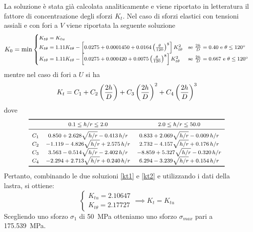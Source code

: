 La soluzione è stata già calcolata analiticamente e viene riportato in letteratura il fattore di concentrazione degli sforzi $K_t$.
Nel caso di sforzi elastici con tensioni assiali e con fori a $V$ viene riportata la seguente soluzione
\begin{equation}\footnotesize\label{kt1}
K_0=\min
\begin{cases}
K_{t\theta}=K_{tu} & \\
K_{t\theta} = 1.11 K_{t\theta} - \left[0.0275 + 0.0001450 + 0.0164\left(\frac{\theta}{120}\right)^8\right]K_{t\theta}^2 & \text{se $\frac{2h}{D} = 0.40$ e $\theta\le \ang{120}$}\\
K_{t\theta} = 1.11 K_{t\theta} - \left[0.0275 + 0.000420 + 0.0075\left(\frac{\theta}{120}\right)^8\right]K_{t\theta}^2 & \text{se $\frac{2h}{D} = 0.667$ e $\theta\le \ang{120}$}
\end{cases}
\end{equation} 
mentre nel caso di fori a $U$ si ha
\begin{equation}\footnotesize\label{kt2}
K_t = C_1 + C_2\left(\frac{2h}{D}\right) + C_3\left(\frac{2h}{D}\right)^2 + C_4\left(\frac{2h}{D}\right)^3
\end{equation} 
dove 
\[ \footnotesize
\begin{array}{ccc}
\toprule
 & 0.1\le h/r\le 2.0 & 2.0\le h/r\le 50.0 \\ \midrule
C_1 & 0.850+2.628\sqrt{h/r}-0.413\,h/r & 0.833+2.069\sqrt{h/r}-0.009\,h/r \\ 
C_2 & -1.119-4.826\sqrt{h/r}+2.575\,h/r & 2.732-4.157\sqrt{h/r}+0.176\,h/r \\  
C_3 & 3.563-0.514\sqrt{h/r}-2.402\,h/r & -8.859+5.327\sqrt{h/r}-0.320\,h/r \\  
C_4 & -2.294 + 2.713\sqrt{h/r}+0.240\,h/r & 6.294-3.239\sqrt{h/r}+0.154\,h/r \\  \bottomrule
\end{array}
\]
Pertanto, combinando le due soluzioni \eqref{kt1} e \eqref{kt2} e utilizzando i dati della lastra, si ottiene:
\[
\begin{cases}
K_{tu}=2.10647\\
K_{t\theta}=2.17727
\end{cases} \implies K_t = K_{tu}
\]
Scegliendo uno sforzo $\sigma_1$ di \SI{50}{\mega\pascal} otteniamo uno sforzo $\sigma_{max}$ pari a \SI{175.539}{\mega\pascal}.

